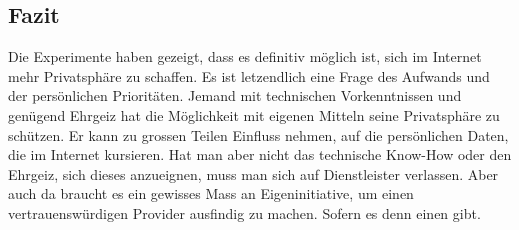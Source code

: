 \subsection{Fazit}

Die Experimente haben gezeigt, dass es definitiv möglich ist, sich im Internet mehr Privatsphäre zu schaffen.
Es ist letzendlich eine Frage des Aufwands und der persönlichen Prioritäten. Jemand mit technischen Vorkenntnissen und genügend Ehrgeiz hat die Möglichkeit mit eigenen Mitteln seine Privatsphäre zu schützen. Er kann zu grossen Teilen Einfluss nehmen, auf die persönlichen Daten, die im Internet kursieren. Hat man aber nicht das technische Know-How oder den Ehrgeiz, sich dieses anzueignen, muss man sich auf Dienstleister verlassen. Aber auch da braucht es ein gewisses Mass an Eigeninitiative, um einen vertrauenswürdigen Provider ausfindig zu machen. Sofern es denn einen gibt.
